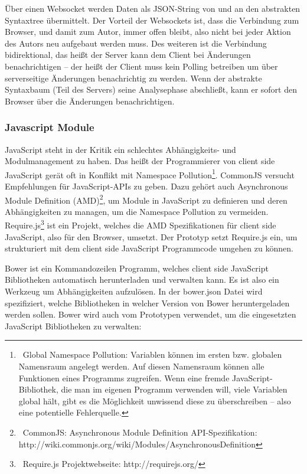  
Über einen Websocket werden Daten als JSON-String von und an den abstrakten Syntaxtree übermittelt. Der Vorteil der Websockets ist, dass die Verbindung zum Browser, und damit zum Autor, immer offen bleibt, also nicht bei jeder Aktion des Autors neu aufgebaut werden muss. Des weiteren ist die Verbindung bidirektional, das heißt der Server kann dem Client bei Änderungen benachrichtigen -- der heißt der Client muss kein Polling betreiben um über serverseitige Änderungen benachrichtig zu werden. Wenn der abstrakte Syntaxbaum (Teil des Servers) seine Analysephase abschließt, kann er sofort den Browser über die Änderungen benachrichtigen.

 
\subsubsection{Javascript Module}\label{}

 
JavaScript steht in der Kritik ein schlechtes Abhängigkeits- und Modulmanagement zu haben. Das heißt der Programmierer von client side JavaScript gerät oft in Konflikt mit Namespace Pollution\footnote{~Global Namespace Pollution: Variablen können im ersten bzw. globalen Namensraum angelegt werden. Auf diesen Namensraum können alle Funktionen eines Programms zugreifen. Wenn eine fremde JavaScript-Bibliothek, die man im eigenen Programm verwenden will, viele Variablen global hält, gibt es die Möglichkeit unwissend diese zu überschreiben -- also eine potentielle Fehlerquelle.}. CommonJS versucht Empfehlungen für JavaScript-APIs zu geben. Dazu gehört auch Asynchronous Module Definition (AMD)\footnote{~CommonJS: Asynchronous Module Definition API-Spezifikation: http://wiki.commonjs.org/wiki/Modules/AsynchronousDefinition}, um Module in JavaScript zu definieren und deren Abhängigkeiten zu managen, um die Namespace Pollution zu vermeiden. Require.js\footnote{~Require.js Projektwebseite: http://requirejs.org/} ist ein Projekt, welches die AMD Spezifikationen für client side JavaScript, also für den Browser, umsetzt. Der Prototyp setzt Require.js ein, um strukturiert mit dem client side JavaScript Programmcode umgehen zu können.

 
Bower ist ein Kommandozeilen Programm, welches client side JavaScript Bibliotheken automatisch herunterladen und verwalten kann. Es ist also ein Werkzeug um Abhängigkeiten aufzulösen. In der bower.json Datei wird spezifiziert, welche Bibliotheken in welcher Version von Bower heruntergeladen werden sollen. Bower wird auch vom Prototypen verwendet, um die eingesetzten JavaScript Bibliotheken zu verwalten:

